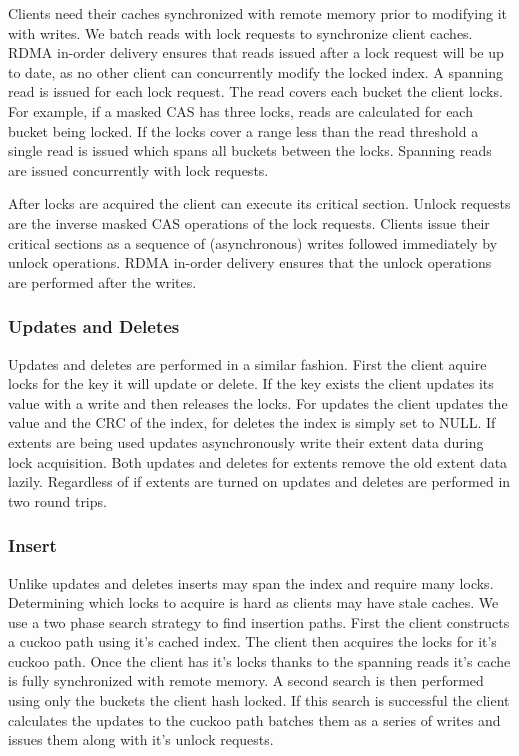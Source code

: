 Clients need their caches synchronized with remote memory
prior to modifying it with writes. We batch reads with lock
requests to synchronize client caches. RDMA in-order
delivery ensures that reads issued after a lock request will
be up to date, as no other client can concurrently modify
the locked index.  A spanning read is issued for each lock
request. The read covers each bucket the client locks.  For example, if a
masked CAS has three locks, reads are calculated for each
bucket being locked. If the locks cover a range less than
the read threshold a single read is issued which spans all
buckets between the locks.  Spanning reads are issued concurrently with
lock requests.

After locks are acquired the client can execute its critical
section. Unlock requests are the inverse masked CAS operations of the
lock requests. Clients issue their critical sections as a sequence of
(asynchronous) writes followed immediately by unlock operations. RDMA
in-order delivery ensures that the unlock operations are performed
after the writes.

\subsubsection{Updates and Deletes}

Updates and deletes are performed in a similar fashion.
First the client aquire locks for the key it will update or
delete. If the key exists the client updates its value with
a write and then releases the locks. For updates the client
updates the value and the CRC of the index, for deletes the
index is simply set to NULL. If extents are being used
updates asynchronously write their extent data during lock
acquisition. Both updates and deletes for extents remove the
old extent data lazily. Regardless of if extents are turned
on updates and deletes are performed in two round trips.

\subsubsection{Insert}

Unlike updates and deletes inserts may span the index and
require many locks. Determining which locks to acquire is
hard as clients may have stale caches. We use a two phase
search strategy to find insertion paths. First the client
constructs a cuckoo path using it's cached index. The client
then acquires the locks for it's cuckoo path. Once the
client has it's locks thanks to the spanning reads it's
cache is fully synchronized with remote memory. A second
search is then performed using only the buckets the client
hash locked. If this search is successful the client
calculates the updates to the cuckoo path batches them as a
series of writes and issues them along with it's unlock
requests.

